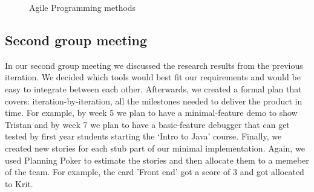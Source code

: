 \documentclass[11pt, a4paper]{article}
\begin{document}
\begin{figure}[ht]
\centering
{}
\quad
{}
\caption{Agile Programming methods}
\label{fig:figure}
\end{figure}

\subsection{Second group meeting}
\indent In our second group meeting we discussed the research results from the previous iteration. We decided which tools would best fit our requirements and would be easy to integrate between each other. Afterwards, we created a formal plan that covers: iteration-by-iteration, all the milestones needed to deliver the product in time. For example, by week 5 we plan to have a minimal-feature demo to show Tristan and by week 7 we plan to have a basic-feature debugger that can get tested by first year students starting the `Intro to Java' course. Finally, we created new stories for each stub part of our minimal implementation. Again, we used Planning Poker to estimate the stories and then allocate them to a memeber of the team. For example, the card 'Front end' got a score of 3 and got allocated to Krit.
\end{document}
